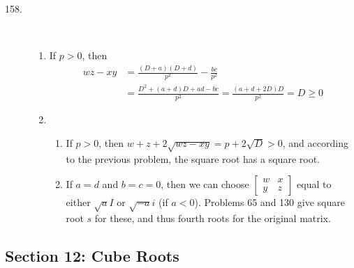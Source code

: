 \documentclass{article}
\begin{document}
\begin{description}
  \item[158.] $\ $
    \begin{enumerate}[\hspace{1cm}(1)]
      \item If $p>0$, then 
        \begin{align*}
        wz-xy & = \frac{(D+a)(D+d)}{p^2} - \frac{bc}{p^2} \\
              & = \frac{D^2 + (a+d)D + ad - bc}{p^2} = \frac{(a+d+2D)D}{p^2} = D \geq 0
        \end{align*}
      \item $\ $
        \begin{enumerate}[\hspace{1cm}(a)]
          \item If $p>0$, then $w + z + 2 \sqrt{wz-xy} = p + 2\sqrt{D} > 0$, and according to the previous problem, the square root has a square root.
          \item If $a=d$ and $b=c=0$, then we can choose $\begin{bmatrix} w & x \\ y & z \end{bmatrix}$ equal to either $\sqrt{a}I$ or $\sqrt{-a}i$ (if $a<0$). Problems 65 and 130 give square root $s$ for these, and thus fourth roots for the original matrix.
        \end{enumerate}
    \end{enumerate}

\end{description}


\subsection*{Section 12: Cube Roots}
\end{document}
